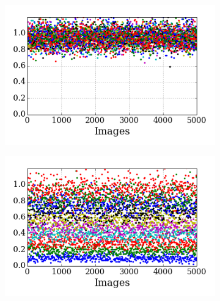 \begin{figure}
\begin{subfigure}[t]{0.48\textwidth}
		\includegraphics[width=\textwidth]{pics_sdlm/21_exp_AE_noise/exp1.png}
		\caption{}
	\end{subfigure}
	\begin{subfigure}[t]{0.48\textwidth}
		\includegraphics[width=\textwidth]{pics_sdlm/21_exp_AE_noise/exp2.png}
		\caption{}
	\end{subfigure}
	\caption{}
	\label{fig:noise_input}
\end{figure}
\DIFaddend 

